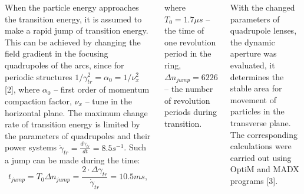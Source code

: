 \documentclass[25pt, a0paper, portrait, blockverticalspace=.5cm]{tikzposter}
\begin{document}
\begin{columns}
{\begin{minipage}{0.485\linewidth}
\begin{tikzpicture}
			\end{tikzpicture}
		\end{minipage}
		\par When the particle energy approaches the transition energy, it is assumed to make a rapid jump of transition energy. This can be achieved by changing the field gradient in the focusing quadrupoles of the arcs, since for periodic structures $1/\gamma_{tr}^{2}=\alpha_{0}=1/\nu_{x}^{2}$ [2], where $\alpha_{0}$ – first order of momentum compaction factor, $\nu_{x}$ – tune in the horizontal plane. The maximum change rate of transition energy is limited by the parameters of quadrupoles and their power systems $\dot\gamma_{tr}=\frac{d\gamma_{tr}}{dt}=8.5 s^{-1}$. Such a jump can be made during the time:
		\begin{equation}
		t_{jump}=T_{0} \Delta n_{jump}=\frac{2 \cdot \Delta \gamma_{tr}}{\dot{\gamma}_{tr}}=10.5 ms,
		\end{equation}
		\par where $T_{0}=1.7 \mu s$ – the time of one revolution period in the ring, $\Delta n_{jump}=6226$ – the number of revolution periods during transition.\\
		\par With the changed parameters of quadrupole lenses, the dynamic aperture was evaluated, it determines the stable area for movement of particles in the transverse plane. The corresponding calculations were carried out using OptiM and MADX programs [3].
	}	
\end{columns}
\end{document}
